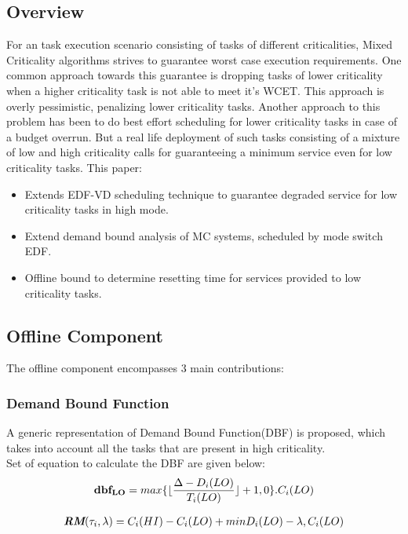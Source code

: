 \subsection{Overview}
For an task execution scenario consisting of tasks of different criticalities, Mixed Criticality algorithms strives to guarantee worst case execution requirements. One common approach towards this guarantee is dropping tasks of lower criticality when a higher criticality task is not able to meet it's WCET.
This approach is overly pessimistic, penalizing lower criticality tasks. Another approach to this problem has been to do best effort scheduling for lower criticality tasks in case of a budget overrun.
But a real life deployment of such tasks consisting of a mixture of low and high criticality calls for guaranteeing a minimum service even for low criticality tasks.
This paper:
\begin{itemize}
	\item Extends EDF-VD scheduling technique to guarantee degraded service for low criticality tasks in high mode.
	\item Extend demand bound analysis of MC systems, scheduled by mode switch EDF.
	\item Offline bound to determine resetting time for services provided to low criticality tasks.
\end{itemize}
\subsection{Offline Component}
The offline component encompasses 3 main contributions:
\subsubsection{Demand Bound Function}
A generic representation of Demand Bound Function(DBF) is proposed, which takes into account all the tasks that are present in high criticality.\\
Set of equation to calculate the DBF are given below:\\

\begin{equation}
\begin{aligned}
 \textbf{dbf\textsubscript{LO}} =  max\{\lfloor \frac{\Delta - D_i(LO)}{T_i(LO)} \rfloor + 1, 0\}.C_i(LO)
 \end{aligned}
\end{equation}

\begin{equation}
\begin{aligned}
\textit{\textbf{RM}}(\tau_i, \lambda) = C_i(HI) - C_i(LO) + min{D_i(LO) - \lambda, C_i(LO)}
\end{aligned}
\end{equation}

